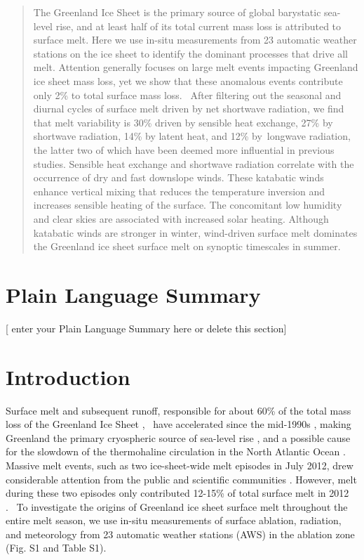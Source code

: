 \documentclass[draft]{agujournal2019}
\begin{document}
\begin{abstract}
The Greenland Ice Sheet is 
the primary source of global barystatic sea-level rise, 
and at least half of its total current mass
loss is attributed to surface melt. Here we use in-situ measurements
from 23 automatic weather stations on the ice sheet to identify the
dominant processes that drive all melt. Attention generally focuses on
large melt events impacting Greenland ice sheet mass loss, yet we show
that these anomalous events contribute only 2\% to
total surface mass loss. ~After filtering out the seasonal and diurnal
cycles of surface melt driven by net shortwave radiation, we find that
melt variability is 30\% driven by sensible heat exchange, 27\% by
shortwave radiation, 14\% by latent heat, and 12\% by~longwave
radiation, the latter two of which have been deemed more influential in
previous studies. Sensible heat exchange and shortwave radiation
correlate with the occurrence of dry and fast downslope winds. These
katabatic winds enhance vertical mixing that reduces the
temperature inversion and increases sensible heating of the surface. The
concomitant low humidity and clear skies are associated with increased
solar heating. Although katabatic winds are stronger in winter,
wind-driven surface melt dominates the Greenland ice sheet surface melt
on synoptic timescales in summer.
\end{abstract}

\section*{Plain Language Summary}
[ enter your Plain Language Summary here or delete this section]


\section{Introduction}
Surface melt and subsequent runoff, 
responsible for about 60\% of the total mass loss of 
the Greenland Ice Sheet \cite{VanDenBroeke2016}, 
have accelerated since the mid-1990s \cite{Fettweis2017}, 
making Greenland the primary cryospheric source 
of sea-level rise \cite{VanDenBroeke2016}, 
and a possible cause for the slowdown of 
the thermohaline circulation in the North Atlantic Ocean \cite{Rahmstorf2015}.
Massive melt events, 
such as two ice-sheet-wide melt episodes in July 2012, 
drew considerable attention from 
the public and scientific communities \cite{Bennartz2013, Tedesco2013, Hanna2014, Neff2014, Fausto2016a}. 
However, melt during these two episodes only contributed 12-15\% of 
total surface melt in 2012 \cite{Fausto2016a}. 
To investigate the origins of Greenland ice sheet surface melt 
throughout the entire melt season, 
we use in-situ measurements of surface ablation, radiation, 
and meteorology from 23 automatic weather stations (AWS) 
in the ablation zone \cite{VanAs2011b} (Fig. S1 and Table S1).
\end{document}
